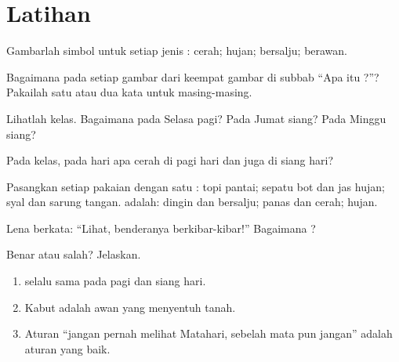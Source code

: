 \section{Latihan}

\begin{exercise}[$\star$]\label{exo:g1:watching-the-weather:1}
Gambarlah simbol untuk setiap jenis : cerah; hujan; bersalju; berawan.
\end{exercise}

\begin{exercise}[$\star$]\label{exo:g1:watching-the-weather:2}
Bagaimana  pada setiap gambar dari keempat gambar di subbab ``Apa itu
?''? Pakailah satu atau dua kata untuk masing-masing.
\end{exercise}

\begin{exercise}[$\star$]\label{exo:g1:watching-the-weather:3}
Lihatlah  kelas. Bagaimana  pada Selasa pagi? Pada
Jumat siang? Pada Minggu siang?
\end{exercise}

\begin{exercise}[$\star$]\label{exo:g1:watching-the-weather:4}
Pada  kelas, pada hari apa  cerah di pagi hari dan juga
di siang hari?
\end{exercise}

\begin{exercise}[$\star$]\label{exo:g1:watching-the-weather:5}
Pasangkan setiap pakaian dengan satu : topi pantai; sepatu bot dan
jas hujan; syal dan sarung tangan.  adalah: dingin dan bersalju;
panas dan cerah; hujan.
\end{exercise}

\begin{exercise}[$\star$]\label{exo:g1:watching-the-weather:6}
Lena berkata: ``Lihat, benderanya berkibar-kibar!'' Bagaimana ?
\end{exercise}

\begin{exercise}[$\star$]\label{exo:g1:watching-the-weather:7}
Benar atau salah? Jelaskan.
\begin{enumerate}
  \item {} selalu sama pada pagi dan siang hari.
  \item Kabut adalah awan yang menyentuh tanah.
  \item Aturan ``jangan pernah melihat Matahari, sebelah mata pun jangan'' adalah aturan yang baik.
\end{enumerate}
\end{exercise}

